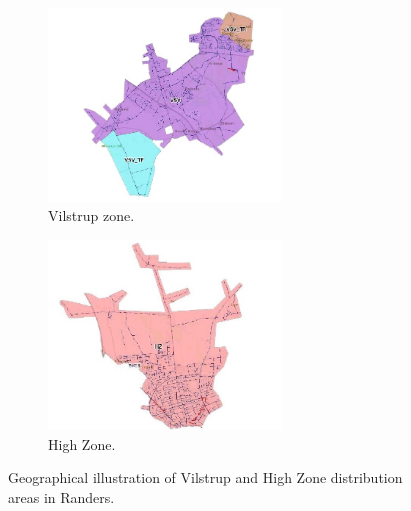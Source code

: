 \begin{figure}[H]
\centering
\begin{subfigure}{.49\textwidth}
\centering
\includegraphics[width=0.68\textwidth]{report/pictures/Vilstrup_region}
  \caption{Vilstrup zone.}
  \label{fig:vilstrup_region}
\end{subfigure}
\begin{subfigure}{.49\textwidth}
\centering
\includegraphics[width=0.68\textwidth]{report/pictures/Highzone_region}
  \caption{High Zone.}
  \label{fig:highzone_region}
\end{subfigure}
\caption{Geographical illustration of Vilstrup and High Zone distribution areas in Randers.}
\label{fig:vsv_hz_pic}
\end{figure}

\vspace{-3mm}


